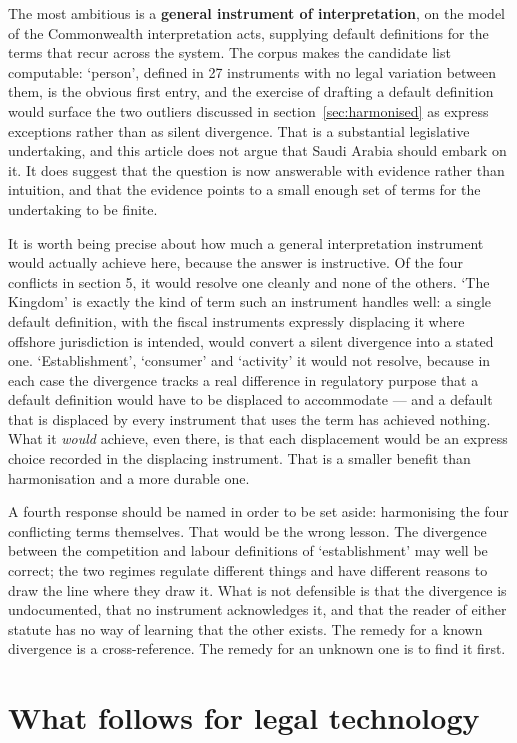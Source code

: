 \documentclass[11pt]{article}
\begin{document}
The most ambitious is a \textbf{general instrument of interpretation}, on the
model of the Commonwealth interpretation acts, supplying default definitions
for the terms that recur across the system. The corpus makes the candidate
list computable: `person', defined in 27 instruments with no legal variation
between them, is the obvious first entry, and the exercise of drafting a
default definition would surface the two outliers discussed in
section~\ref{sec:harmonised} as
express exceptions rather than as silent divergence. That is a substantial
legislative undertaking, and this article does not argue that Saudi Arabia
should embark on it. It does suggest that the question is now answerable with
evidence rather than intuition, and that the evidence points to a small
enough set of terms for the undertaking to be finite.

It is worth being precise about how much a general interpretation instrument
would actually achieve here, because the answer is instructive. Of the four
conflicts in section 5, it would resolve one cleanly and none of the others.
`The Kingdom' is exactly the kind of term such an instrument handles well: a
single default definition, with the fiscal instruments expressly displacing
it where offshore jurisdiction is intended, would convert a silent divergence
into a stated one. `Establishment', `consumer' and `activity' it would not
resolve, because in each case the divergence tracks a real difference in
regulatory purpose that a default definition would have to be displaced to
accommodate --- and a default that is displaced by every instrument that uses
the term has achieved nothing. What it \emph{would} achieve, even there, is
that each displacement would be an express choice recorded in the displacing
instrument. That is a smaller benefit than harmonisation and a more durable
one.

A fourth response should be named in order to be set aside: harmonising the
four conflicting terms themselves. That would be the wrong lesson. The
divergence between the competition and labour definitions of `establishment'
may well be correct; the two regimes regulate different things and have
different reasons to draw the line where they draw it. What is not defensible
is that the divergence is undocumented, that no instrument acknowledges it,
and that the reader of either statute has no way of learning that the other
exists. The remedy for a known divergence is a cross-reference. The remedy
for an unknown one is to find it first.

\section{What follows for legal technology}
\end{document}
